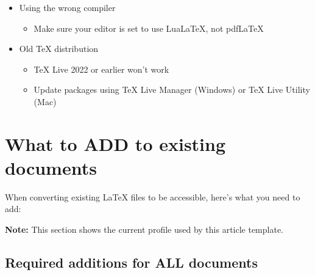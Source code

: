 \documentclass{article}
\newcommand\RedText[1]{\textcolor{AccessibleRed}{#1}}
\newcommand\GreenText[1]{\textcolor{AccessibleGreen}{#1}}
\begin{document}
\begin{itemize}
  \item \RedText{Using the wrong compiler}
    \begin{itemize}
    \item Make sure your editor is set to use \GreenText{LuaLaTeX}, not \RedText{pdfLaTeX}
    \end{itemize}
    
  \item \RedText{Old TeX distribution}
    \begin{itemize}
    \item TeX Live 2022 or earlier won't work
    \item Update packages using TeX Live Manager (Windows) or TeX Live Utility (Mac)
    \end{itemize}
    
  \end{itemize}


\section{What to ADD to existing documents}

When converting existing LaTeX files to be accessible, here's what you need to add:

\noindent \textbf{Note:} This section shows the current profile used by this article template.

\subsection{Required additions for ALL documents}
\end{document}
